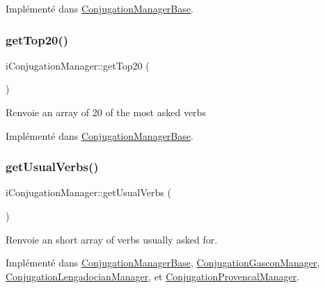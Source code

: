 Implémenté dans \hyperlink{class_conjugation_manager_base_ac2e82ace9b19d7b014908ec275b552bc}{Conjugation\+Manager\+Base}.

\hypertarget{interfacei_conjugation_manager_a0273fc00cbbf9e83823d571e3e2c8945}{}\label{interfacei_conjugation_manager_a0273fc00cbbf9e83823d571e3e2c8945} 
\subsubsection{\texorpdfstring{get\+Top20()}{getTop20()}}
{\footnotesize\ttfamily i\+Conjugation\+Manager\+::get\+Top20 (\begin{DoxyParamCaption}{ }\end{DoxyParamCaption})}

\begin{DoxyReturn}{Renvoie}
an array of 20 of the most asked verbs 
\end{DoxyReturn}


Implémenté dans \hyperlink{class_conjugation_manager_base_a63728ecfb3a2eb259accf59dd79e9c26}{Conjugation\+Manager\+Base}.

\hypertarget{interfacei_conjugation_manager_a2a7ed39313c1c92ef5c01c88895de36e}{}\label{interfacei_conjugation_manager_a2a7ed39313c1c92ef5c01c88895de36e} 
\subsubsection{\texorpdfstring{get\+Usual\+Verbs()}{getUsualVerbs()}}
{\footnotesize\ttfamily i\+Conjugation\+Manager\+::get\+Usual\+Verbs (\begin{DoxyParamCaption}{ }\end{DoxyParamCaption})}

\begin{DoxyReturn}{Renvoie}
an short array of verbs usually asked for. 
\end{DoxyReturn}


Implémenté dans \hyperlink{class_conjugation_manager_base_a1dff05e951fe4453247a97f5aff5bc83}{Conjugation\+Manager\+Base}, \hyperlink{class_conjugation_gascon_manager_a4117ecff48a5baa29d894f6174d88983}{Conjugation\+Gascon\+Manager}, \hyperlink{class_conjugation_lengadocian_manager_a1ec18e3663eae35578b4f1967e4d981d}{Conjugation\+Lengadocian\+Manager}, et \hyperlink{class_conjugation_provencal_manager_ab54b1aaa7e39d3f31d416640322eae5a}{Conjugation\+Provencal\+Manager}.

